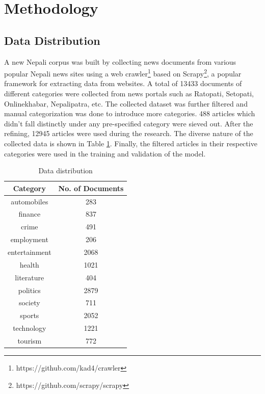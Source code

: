 \documentclass[fleqn --11pt --twoside]{IOEGC2016} %
\begin{document}
\section{Methodology}
\subsection{Data Distribution}
A new Nepali corpus was built by collecting news documents from various popular Nepali news sites using a web crawler\footnote{\label{crawler}https://github.com/kad4/crawler} based on Scrapy\footnote{\label{scrapy}https://github.com/scrapy/scrapy}, a popular framework for extracting data from websites. 
A total of 13433 documents of different categories were collected from news portals such as Ratopati, Setopati, Onlinekhabar, Nepalipatra, etc. The collected dataset was further filtered and manual categorization was done to introduce more categories. 488 articles which didn't fall distinctly under any pre-specified category were sieved out. After the refining, 12945 articles were used during the research. The diverse nature of the collected data is shown in Table \ref{tab:data_distribution}. Finally, the filtered articles in their respective categories were used in the training and validation of the model.
\begin{table}[!ht]
\centering
    \caption{Data distribution}
    \begin{tabular}{|c|c|}
    \hline
        Category & No. of Documents \\ \hline
        automobiles & 283 \\ \hline
        finance & 837 \\ \hline
        crime & 491 \\ \hline
        employment & 206 \\ \hline
        entertainment & 2068 \\ \hline
        health & 1021 \\ \hline
        literature & 404 \\ \hline
        politics & 2879 \\ \hline
        society & 711 \\ \hline
        sports & 2052 \\ \hline
        technology & 1221 \\ \hline
        tourism & 772 \\ \hline
    \end{tabular}
    \label{tab:data_distribution}
\end{table}
\end{document}
